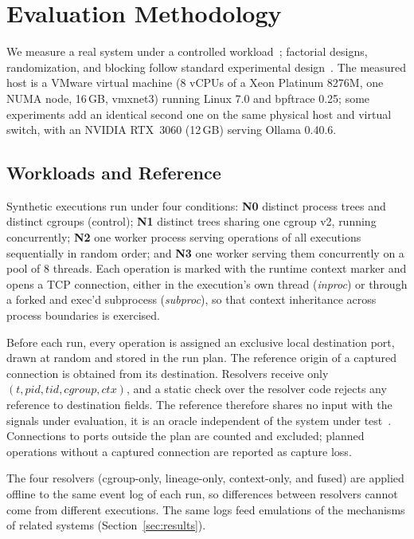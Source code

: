 \section{Evaluation Methodology}
\label{sec:method}

We measure a real system under a controlled workload~\cite{jain1991art}; factorial designs, randomization, and blocking follow standard experimental design~\cite{montgomery2017design}. The measured host is a VMware virtual machine (8 vCPUs of a Xeon Platinum 8276M, one NUMA node, 16\,GB, vmxnet3) running Linux 7.0 and bpftrace 0.25; some experiments add an identical second one on the same physical host and virtual switch, with an NVIDIA RTX~3060 (12\,GB) serving Ollama 0.40.6.

\subsection{Workloads and Reference}

Synthetic executions run under four conditions: \textbf{N0} distinct process trees and distinct cgroups (control); \textbf{N1} distinct trees sharing one cgroup v2, running concurrently; \textbf{N2} one worker process serving operations of all executions sequentially in random order; and \textbf{N3} one worker serving them concurrently on a pool of 8 threads. Each operation is marked with the runtime context marker and opens a TCP connection, either in the execution's own thread (\emph{inproc}) or through a forked and exec'd subprocess (\emph{subproc}), so that context inheritance across process boundaries is exercised.

Before each run, every operation is assigned an exclusive local destination port, drawn at random and stored in the run plan. The reference origin of a captured connection is obtained from its destination. Resolvers receive only $(t, \mathit{pid}, \mathit{tid}, \mathit{cgroup}, \mathit{ctx})$, and a static check over the resolver code rejects any reference to destination fields. The reference therefore shares no input with the signals under evaluation, \ie it is an oracle independent of the system under test~\cite{barr2015oracle}. Connections to ports outside the plan are counted and excluded; planned operations without a captured connection are reported as capture loss.

The four resolvers (cgroup-only, lineage-only, context-only, and fused) are applied offline to the same event log of each run, so differences between resolvers cannot come from different executions. The same logs feed emulations of the mechanisms of related systems (\cf Section~\ref{sec:results}).


